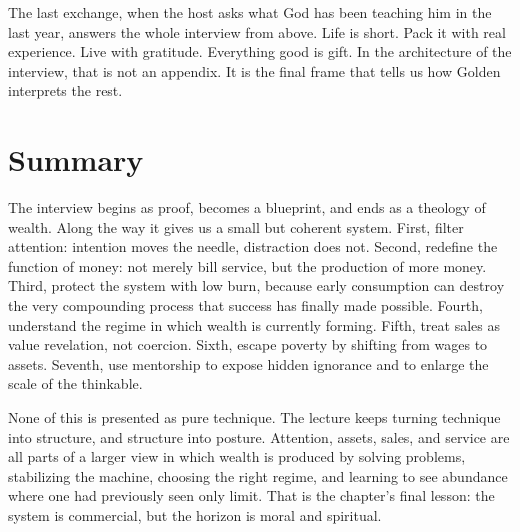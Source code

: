 The last exchange, when the host asks what God has been teaching him in the last year, answers the whole interview from above. Life is short. Pack it with real experience. Live with gratitude. Everything good is gift. In the architecture of the interview, that is not an appendix. It is the final frame that tells us how Golden interprets the rest.

\section{Summary}

The interview begins as proof, becomes a blueprint, and ends as a theology of wealth. Along the way it gives us a small but coherent system. First, filter attention: intention moves the needle, distraction does not. Second, redefine the function of money: not merely bill service, but the production of more money. Third, protect the system with low burn, because early consumption can destroy the very compounding process that success has finally made possible. Fourth, understand the regime in which wealth is currently forming. Fifth, treat sales as value revelation, not coercion. Sixth, escape poverty by shifting from wages to assets. Seventh, use mentorship to expose hidden ignorance and to enlarge the scale of the thinkable.

None of this is presented as pure technique. The lecture keeps turning technique into structure, and structure into posture. Attention, assets, sales, and service are all parts of a larger view in which wealth is produced by solving problems, stabilizing the machine, choosing the right regime, and learning to see abundance where one had previously seen only limit. That is the chapter's final lesson: the system is commercial, but the horizon is moral and spiritual.